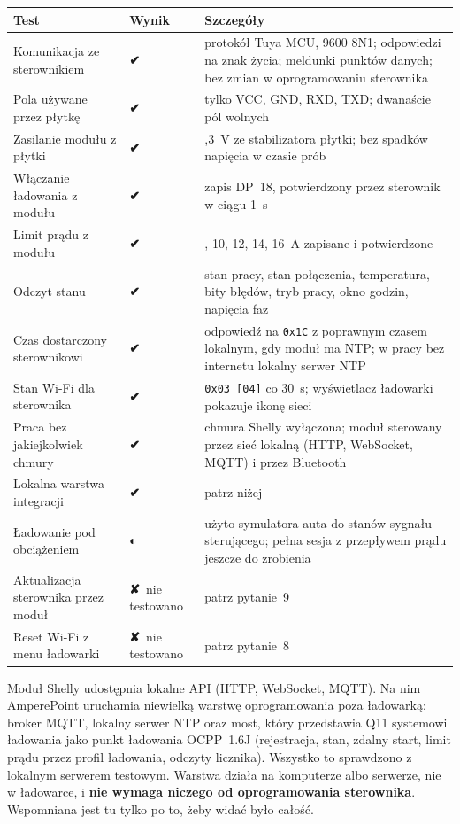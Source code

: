 \documentclass[11pt,a4paper]{article}
\newcommand{\ok}{{\symbolfont\color{apgreen}\textbf{✔}}}
\newcommand{\half}{{\symbolfont\color{apwarn}\textbf{◐}}}
\newcommand{\no}{{\symbolfont\color{apred}\textbf{✘}}}
\newcommand{\hx}[1]{\texttt{#1}}
\begin{document}
\begin{longtable}{>{\raggedright\arraybackslash}p{4.2cm}>{\raggedright\arraybackslash}p{1.7cm}>{\raggedright\arraybackslash}p{10.1cm}}
\toprule
\rowcolor{aphead}\textbf{Test} & \textbf{Wynik} & \textbf{Szczegóły} \\
\midrule\endhead
\bottomrule\endfoot
Komunikacja ze sterownikiem & \ok & protokół Tuya MCU, 9600 8N1; odpowiedzi na znak życia; meldunki punktów danych; bez zmian w oprogramowaniu sterownika \\
Pola używane przez płytkę & \ok & tylko VCC, GND, RXD, TXD; dwanaście pól wolnych \\
Zasilanie modułu z płytki & \ok & 3,3~V ze stabilizatora płytki; bez spadków napięcia w czasie prób \\
Włączanie ładowania z modułu & \ok & zapis DP~18, potwierdzony przez sterownik w ciągu 1~s \\
Limit prądu z modułu & \ok & 8, 10, 12, 14, 16~A zapisane i potwierdzone \\
Odczyt stanu & \ok & stan pracy, stan połączenia, temperatura, bity błędów, tryb pracy, okno godzin, napięcia faz \\
Czas dostarczony sterownikowi & \ok & odpowiedź na \hx{0x1C} z poprawnym czasem lokalnym, gdy moduł ma NTP; w pracy bez internetu lokalny serwer NTP \\
Stan Wi-Fi dla sterownika & \ok & \hx{0x03 [04]} co 30~s; wyświetlacz ładowarki pokazuje ikonę sieci \\
Praca bez jakiejkolwiek chmury & \ok & chmura Shelly wyłączona; moduł sterowany przez sieć lokalną (HTTP, WebSocket, MQTT) i przez Bluetooth \\
Lokalna warstwa integracji & \ok & patrz niżej \\
Ładowanie pod obciążeniem & \half & użyto symulatora auta do stanów sygnału sterującego; pełna sesja z przepływem prądu jeszcze do zrobienia \\
Aktualizacja sterownika przez moduł & \no\ nie testowano & patrz pytanie~9 \\
Reset Wi-Fi z menu ładowarki & \no\ nie testowano & patrz pytanie~8 \\
\end{longtable}

\begin{apbox}
Moduł Shelly udostępnia lokalne API (HTTP, WebSocket, MQTT). Na nim AmperePoint uruchamia niewielką warstwę oprogramowania poza ładowarką: broker MQTT, lokalny serwer NTP oraz most, który przedstawia Q11 systemowi ładowania jako punkt ładowania OCPP~1.6J (rejestracja, stan, zdalny start, limit prądu przez profil ładowania, odczyty licznika). Wszystko to sprawdzono z lokalnym serwerem testowym. Warstwa działa na komputerze albo serwerze, nie w ładowarce, i \textbf{nie wymaga niczego od oprogramowania sterownika}. Wspomniana jest tu tylko po to, żeby widać było całość.
\end{apbox}
\end{document}
